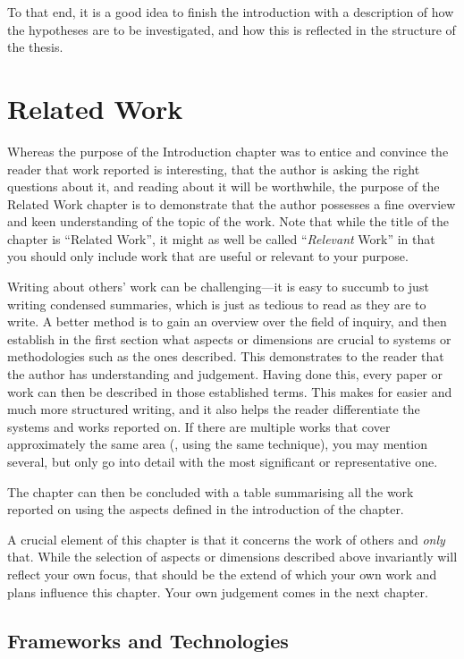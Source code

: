 \documentclass[ twoside,openright,titlepage,numbers=noenddot,headinclude,%
                footinclude=true,cleardoublepage=empty,abstractoff, %
                BCOR=5mm,paper=a4,fontsize=11pt,%
                ngerman,american,%
                ]{scrreprt}
\begin{document}
To that end, it is a good idea to finish the introduction with a
description of how the hypotheses are to be investigated, and how this
is reflected in the structure of the thesis.

\chapter{Related Work}
\label{cha:related-work}

Whereas the purpose of the Introduction chapter was to entice and
convince the reader that work reported is interesting, that the author
is asking the right questions about it, and reading about it will be
worthwhile, the purpose of the Related Work chapter is to
demonstrate that the author possesses a fine overview and keen
understanding of the topic of the work.  Note that while the title of
the chapter is ``Related Work'', it might as well be called
``\emph{Relevant} Work'' in that you should only include work that are
useful or relevant to your purpose. 

Writing about others' work can be challenging---it is easy to succumb
to just writing condensed summaries, which is just as tedious to read
as they are to write. A better method is to gain an overview over the
field of inquiry, and then establish in the first section what aspects
or dimensions are crucial to systems or methodologies such as the ones
described. This demonstrates to the reader that the author has
understanding and judgement. Having done this, every paper or work can
then be described in those established terms. This makes for easier
and much more structured writing, and it also helps the reader
differentiate the systems and works reported on. If there are multiple
works that cover approximately the same area (\eg, using the same
technique), you may mention several, but only go into detail with the
most significant or representative one.

The chapter can then be concluded with a table summarising all the
work reported on using the aspects defined in the introduction of the
chapter.

A crucial element of this chapter is that it concerns the work of
others and \emph{only} that. While the selection of aspects or
dimensions described above invariantly will reflect your own focus,
that should be the extend of which your own work and plans influence
this chapter.  Your own judgement comes in the next chapter.

\section{Frameworks and Technologies}
\label{sec:fram-techn}
\end{document}
